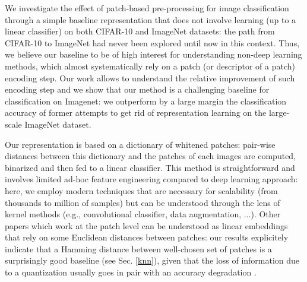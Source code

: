 \documentclass{article} %
\begin{document}

We investigate the effect of patch-based pre-processing for image classification through a simple baseline representation that does not involve learning  (up to a linear classifier) on both CIFAR-10 and ImageNet datasets: the path from CIFAR-10 to ImageNet had never been explored until now in this context.  Thus, we believe our baseline to be of high interest for understanding non-deep learning methods, which almost systematically rely on a patch (or descriptor of a patch) encoding step. Our work allows to understand the relative improvement of such encoding step and we show that our method is a challenging baseline for classification on Imagenet:  we outperform by a large margin the classification accuracy of former attempts to get rid of representation learning on the large-scale ImageNet dataset.


Our representation is based on a dictionary of whitened patches: pair-wise distances between this dictionary and the patches of each images are computed, binarized and then fed to a linear classifier. This method is  straightforward and involves limited ad-hoc feature engineering compared to deep learning approach: here, we  employ modern  techniques that are necessary for scalability (from thousands to million of samples) but can be understood through the lens of kernel methods (e.g., convolutional classifier, data augmentation, ...). 
Other papers which work at the patch level can be understood as linear embeddings that rely on some Euclidean distances between patches: our results explicitely indicate that a Hamming distance between well-chosen set of patches is a surprisingly good baseline (see Sec. \ref{knn}), given that the loss of information due to a quantization usually goes in pair with an accuracy degradation \citep{coates2011analysis}.
\end{document}
